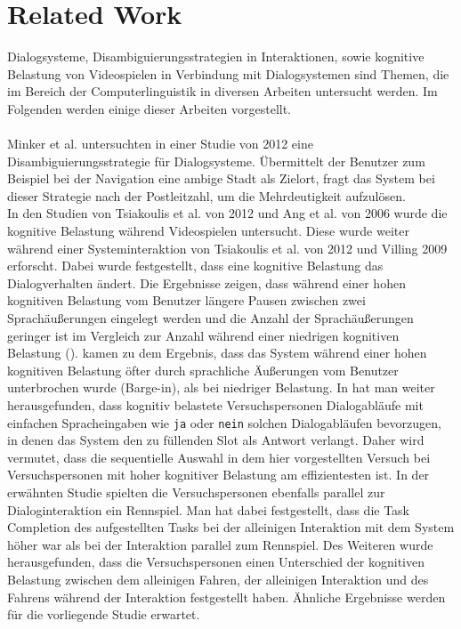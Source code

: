 \documentclass[12pt,a4paper]{scrartcl}
\begin{document}
\newpage
\section{Related Work}

Dialogsysteme, Disambiguierungsstrategien in Interaktionen, sowie kognitive Belastung von Videospielen in Verbindung mit Dialogsystemen sind Themen, die im Bereich der Computerlinguistik in diversen Arbeiten untersucht werden. Im Folgenden werden einige dieser Arbeiten vorgestellt. \\
\\
Minker et al. untersuchten in einer Studie von 2012 eine Disambiguierungsstrategie für Dialogsysteme. Übermittelt der Benutzer zum Beispiel bei der Navigation eine ambige Stadt als Zielort, fragt das System bei dieser Strategie nach der Postleitzahl, um die Mehrdeutigkeit aufzulösen. \\
In den Studien von Tsiakoulis et al. von 2012 und Ang et al. von 2006 wurde die kognitive Belastung während Videospielen untersucht. Diese wurde weiter während einer Systeminteraktion von Tsiakoulis et al. von 2012 und Villing 2009 erforscht. Dabei wurde festgestellt, dass eine kognitive Belastung das Dialogverhalten ändert. Die Ergebnisse zeigen, dass während einer hohen kognitiven Belastung vom Benutzer längere Pausen zwischen zwei Sprachäußerungen eingelegt werden und die Anzahl der Sprachäußerungen geringer ist im Vergleich zur Anzahl während einer niedrigen kognitiven Belastung (\cite{DbCL}).
\cite{eCLDS} kamen zu dem Ergebnis, dass das System während einer hohen kognitiven Belastung öfter durch sprachliche Äußerungen vom Benutzer unterbrochen wurde (Barge-in), als bei niedriger Belastung.
In \cite{eCLDS} hat man weiter herausgefunden, dass kognitiv belastete Versuchspersonen Dialogabläufe mit einfachen Spracheingaben wie \texttt{ja} oder \texttt{nein} solchen Dialogabläufen bevorzugen, in denen das System den zu füllenden Slot als Antwort verlangt. Daher wird vermutet, dass die sequentielle Auswahl in dem hier vorgestellten Versuch bei Versuchspersonen mit hoher kognitiver Belastung am effizientesten ist.  In der erwähnten Studie spielten die Versuchspersonen ebenfalls parallel zur Dialoginteraktion ein Rennspiel. Man hat dabei festgestellt, dass die Task Completion des aufgestellten Tasks bei der alleinigen Interaktion mit dem System höher war als bei der Interaktion parallel zum Rennspiel. Des Weiteren wurde herausgefunden, dass die Versuchspersonen einen Unterschied der kognitiven Belastung zwischen dem alleinigen Fahren, der alleinigen Interaktion und des Fahrens während der Interaktion festgestellt haben. Ähnliche Ergebnisse werden für die vorliegende Studie erwartet. \\
\end{document}
